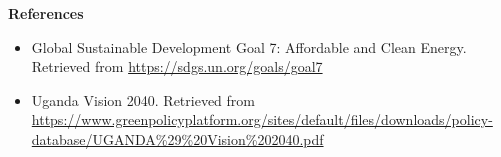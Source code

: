 \documentclass[12pt]{article}
\begin{document}
\bigskip

\noindent \textbf{References}
\begin{itemize}
    \item Global Sustainable Development Goal 7: Affordable and Clean Energy. Retrieved from \url{https://sdgs.un.org/goals/goal7}
    \item Uganda Vision 2040. Retrieved from \url{https://www.greenpolicyplatform.org/sites/default/files/downloads/policy-database/UGANDA%29%20Vision%202040.pdf}
\end{itemize}
\end{document}
